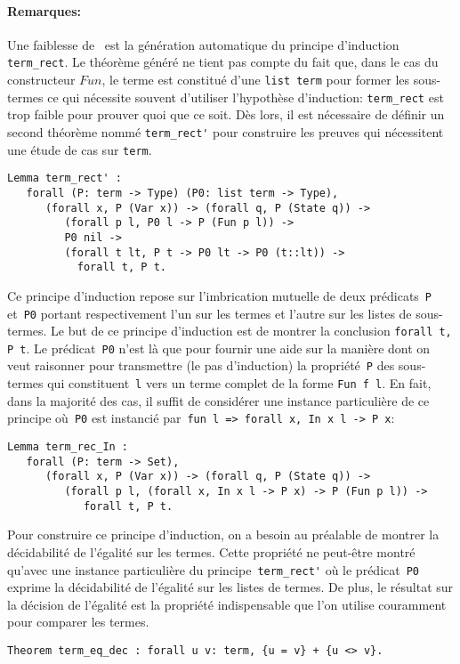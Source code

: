 \paragraph{Remarques:}
Une faiblesse de \coq\ est la génération automatique du principe
d'induction \lstinline!term_rect!. Le théorème généré ne tient pas
compte du fait que, dans le cas du constructeur $Fun$, le terme est constitué d'une
\lstinline!list term! pour former les sous-termes ce qui
nécessite souvent d'utiliser l'hypothèse d'induction:
\lstinline!term_rect! est trop faible pour prouver quoi que ce soit.
Dès lors, il est nécessaire de définir un second théorème nommé \lstinline!term_rect'! pour
construire les preuves qui nécessitent une étude de cas sur \lstinline!term!.
\begin{lstlisting}
Lemma term_rect' : 
   forall (P: term -> Type) (P0: list term -> Type),
      (forall x, P (Var x)) -> (forall q, P (State q)) ->
         (forall p l, P0 l -> P (Fun p l)) ->
         P0 nil ->
         (forall t lt, P t -> P0 lt -> P0 (t::lt)) ->
           forall t, P t.
\end{lstlisting}
Ce principe d'induction repose sur l'imbrication mutuelle de deux prédicats~\lstinline!P! et~\lstinline!P0!
portant respectivement l'un sur les termes et l'autre sur les listes de sous-termes. Le but de ce principe
d'induction est de montrer la conclusion \lstinline!forall t, P t!.
Le prédicat~\lstinline!P0! n'est là que pour fournir une aide sur la manière dont on veut raisonner pour transmettre
(le pas d'induction) la propriété~\lstinline!P! des sous-termes qui constituent~\lstinline!l! vers un terme complet de la forme \lstinline!Fun f l!.
En fait, dans la majorité des cas, il suffit de considérer une instance particulière de ce principe 
où~\lstinline!P0! est instancié par~\lstinline!fun l => forall x, In x l -> P x!:
\begin{lstlisting}
Lemma term_rec_In :
   forall (P: term -> Set),
      (forall x, P (Var x)) -> (forall q, P (State q)) ->
         (forall p l, (forall x, In x l -> P x) -> P (Fun p l)) ->
            forall t, P t.
\end{lstlisting}
Pour construire ce principe d'induction, on a besoin au préalable de montrer la décidabilité de l'égalité
sur les termes. Cette propriété ne peut-être montré qu'avec une instance particulière du principe~\lstinline!term_rect'!
où le prédicat~\lstinline!P0! exprime la décidabilité de l'égalité sur les listes de termes.
De plus, le résultat sur la décision de l'égalité est la propriété indispensable que l'on utilise couramment 
pour comparer les termes. %
\begin{lstlisting}
Theorem term_eq_dec : forall u v: term, {u = v} + {u <> v}.
\end{lstlisting}


